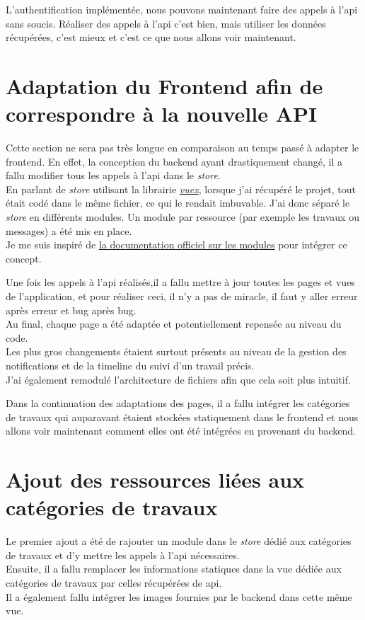 \documentclass[
    iai, %
    il, %
]{heig-tb}
\begin{document}
L'authentification implémentée, nous pouvons maintenant faire des appels à l'\Gls{api} sans soucis. Réaliser des appels à l'\Gls{api} c'est bien, mais utiliser les données récupérées, c'est mieux et c'est ce que nous allons voir maintenant.

\section{Adaptation du Frontend afin de correspondre à la nouvelle API}
Cette section ne sera pas très longue en comparaison au temps passé à adapter le \Gls{frontend}. En effet, la conception du \Gls{backend} ayant drastiquement changé, il a fallu modifier tous les appels à l'\Gls{api} dans le \emph{store}. \\
En parlant de \emph{store} utilisant la librairie \href{https://vuex.vuejs.org/}{\emph{vuex}}, lorsque j'ai récupéré le projet, tout était codé dans le même fichier, ce qui le rendait imbuvable. J'ai donc séparé le \emph{store} en différents modules. Un module par ressource (par exemple les travaux ou messages) a été mis en place. \\
Je me suis inspiré de \href{https://vuex.vuejs.org/guide/modules.html}{la documentation officiel sur les modules} pour intégrer ce concept.

Une fois les appels à l'\Gls{api} réalisés,il a fallu mettre à jour toutes les pages et vues de l'application, et pour réaliser ceci, il n'y a pas de miracle, il faut y aller erreur après erreur et bug après bug. \\
Au final, chaque page a été adaptée et potentiellement repensée au niveau du code. \\
Les plus gros changements étaient surtout présents au niveau de la gestion des notifications et de la timeline du suivi d'un travail précis. \\
J'ai également remodulé l'architecture de fichiers afin que cela soit plus intuitif.

Dans la continuation des adaptations des pages, il a fallu intégrer les catégories de travaux qui auparavant étaient stockées statiquement dans le \Gls{frontend} et nous allons voir maintenant comment elles ont été intégrées en provenant du \Gls{backend}.

\section{Ajout des ressources liées aux catégories de travaux}
Le premier ajout a été de rajouter un module dans le \emph{store} dédié aux catégories de travaux et d'y mettre les appels à l'\Gls{api} nécessaires. \\
Ensuite, il a fallu remplacer les informations statiques dans la vue dédiée aux catégories de travaux par celles récupérées de \Gls{api}. \\
Il a également fallu intégrer les images fournies par le \Gls{backend} dans cette même vue.
\end{document}
